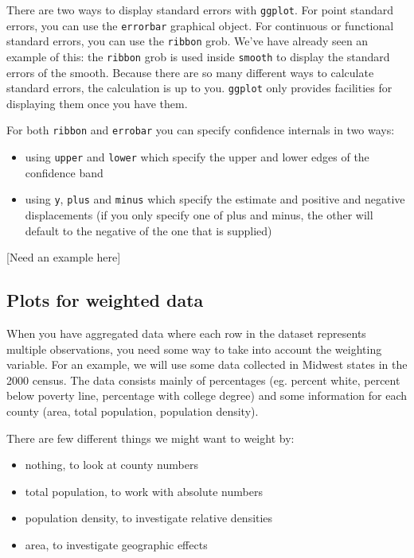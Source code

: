 There are two ways to display standard errors with {\tt ggplot}.  For point standard errors, you can use the {\tt errorbar} graphical object.  For continuous or functional standard errors, you can use the {\tt ribbon} grob.  We've have already seen an example of this: the {\tt ribbon} grob is used inside {\tt smooth} to display the standard errors of the smooth.  Because there are so many different ways to calculate standard errors, the calculation is up to you.  {\tt ggplot} only provides facilities for displaying them once you have them.

For both {\tt ribbon} and {\tt errobar} you can specify confidence internals in two ways:

\begin{itemize}
	\item using {\tt upper} and {\tt lower} which specify the upper and lower edges of the confidence band

	\item using {\tt y}, {\tt plus} and {\tt minus} which specify the estimate and positive and negative displacements (if you only specify one of plus and minus, the other will default to the negative of the one that is supplied)
\end{itemize}

[Need an example here]

\subsection{Plots for weighted data}\label{sec:weighted_data}

When you have aggregated data where each row in the dataset represents multiple observations, you need some way to take into account the weighting variable.  For an example, we will use some data collected in Midwest states in the 2000 census.  The data consists mainly of percentages (eg. percent white, percent below poverty line, percentage with college degree) and some information for each county (area, total population, population density).

There are few different things we might want to weight by: 

\begin{itemize}
	\item nothing, to look at county numbers
	\item total population, to work with absolute numbers
	\item population density, to investigate relative densities
	\item area, to investigate geographic effects
\end{itemize}

